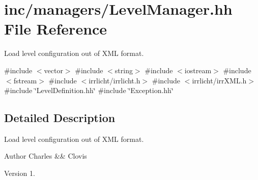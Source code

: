 \hypertarget{LevelManager_8hh}{}\section{inc/managers/\+Level\+Manager.hh File Reference}
\label{LevelManager_8hh}


Load level configuration out of X\+ML format.  


{\ttfamily \#include $<$vector$>$}\newline
{\ttfamily \#include $<$string$>$}\newline
{\ttfamily \#include $<$iostream$>$}\newline
{\ttfamily \#include $<$fstream$>$}\newline
{\ttfamily \#include $<$irrlicht/irrlicht.\+h$>$}\newline
{\ttfamily \#include $<$irrlicht/irr\+X\+M\+L.\+h$>$}\newline
{\ttfamily \#include \char`\"{}Level\+Definition.\+hh\char`\"{}}\newline
{\ttfamily \#include \char`\"{}Exception.\+hh\char`\"{}}\newline


\subsection{Detailed Description}
Load level configuration out of X\+ML format. 

\begin{DoxyAuthor}{Author}
Charles \&\& Clovis 
\end{DoxyAuthor}
\begin{DoxyVersion}{Version}
1. 
\end{DoxyVersion}
